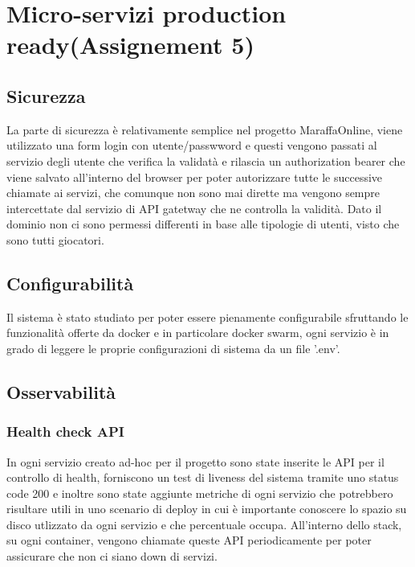 \chapter{Micro-servizi production ready(Assignement 5)}
\label{ch:production_ready}

\section{Sicurezza}

La parte di sicurezza è relativamente semplice nel progetto MaraffaOnline, viene utilizzato una form login con utente/passwword e questi vengono passati al servizio degli utente che verifica la validatà e rilascia un authorization bearer che viene salvato all'interno del browser per poter autorizzare tutte le successive chiamate ai servizi, che comunque non sono mai dirette ma vengono sempre intercettate dal servizio di API gatetway che ne controlla la validità. 
Dato il dominio non ci sono permessi differenti in base alle tipologie di utenti, visto che sono tutti giocatori.

\section{Configurabilità}

Il sistema è stato studiato per poter essere pienamente configurabile sfruttando le funzionalità offerte da docker e in particolare docker swarm, ogni servizio è in grado di leggere le proprie configurazioni di sistema da un file '.env'.

\section{Osservabilità}

\subsection{Health check API}

In ogni servizio creato ad-hoc per il progetto sono state inserite le API per il controllo di health, forniscono un test di liveness del sistema tramite uno status code 200 e inoltre sono state aggiunte metriche di ogni servizio che potrebbero risultare utili in uno scenario di deploy in cui è importante conoscere lo spazio su disco utlizzato da ogni servizio e che percentuale occupa. 
All'interno dello stack, su ogni container, vengono chiamate queste API periodicamente per poter assicurare che non ci siano down di servizi.

